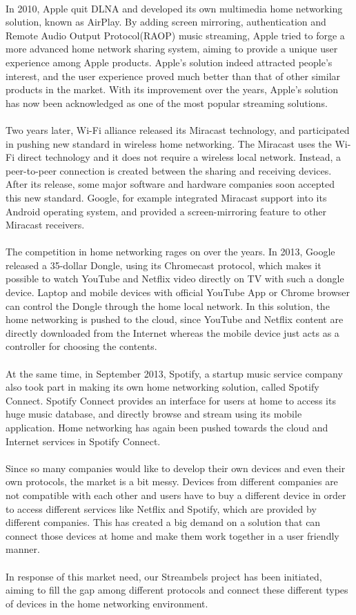 \\
In 2010, Apple quit DLNA and developed its own multimedia home networking 
solution, known as AirPlay. By adding screen mirroring, authentication and Remote 
Audio Output Protocol(RAOP) music streaming, Apple tried to forge a more advanced 
home network sharing system, aiming to provide a unique user experience among Apple 
products. Apple's solution indeed attracted people's interest, and the user experience 
proved much better than that of other similar products in the market. With its improvement
 over the years,  Apple's solution has now been acknowledged as one of the most popular streaming 
solutions.\\
\\
Two years later, Wi-Fi alliance released its Miracast technology, and 
participated in pushing new standard in wireless home networking. The Miracast 
uses the Wi-Fi direct technology and it does not require a wireless local 
network. Instead, a peer-to-peer connection is created between the sharing and 
receiving devices. After its release, some major software and hardware 
companies soon accepted this new standard. Google, for example integrated Miracast 
support into its Android operating system, and provided a screen-mirroring feature 
to other Miracast receivers. \\
\\
The competition in home networking rages on over the years. In 2013, Google released a 35-dollar 
Dongle, using its Chromecast protocol, which makes it possible to watch 
YouTube and Netflix video directly on TV with such a dongle device. Laptop and mobile 
devices with official YouTube App or Chrome browser can control the Dongle 
through the home local network. In this solution, the home networking is pushed to the 
cloud, since YouTube and Netflix content are directly downloaded from the Internet whereas the
mobile device just acts as a controller for choosing the contents. \\
\\
At the same time, in September 2013, Spotify, a startup music service 
company also took part in making its own home networking solution, called 
Spotify Connect. Spotify Connect provides an interface for users at home to access its huge 
music database, and directly browse and stream using its mobile application. Home 
networking has again been pushed towards the cloud and Internet services in Spotify Connect. \\
\\
Since so many companies would like to develop their own devices and even their 
own protocols, the market is a bit messy. Devices from different companies are not compatible with each other and users have to buy a different device in order to access different services like Netflix and Spotify, which are provided by different companies.  This has created a big demand on a solution that can connect those devices at home and make them work together in a user friendly manner. \\
\\
In response of this market need, our Streambels project has been initiated, aiming to fill the gap among different protocols and connect these different types of devices in the home networking environment.
